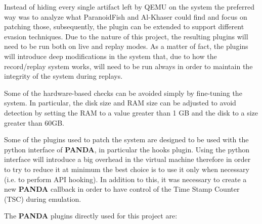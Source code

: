 Instead of hiding every single artifact left by QEMU on the system the preferred way was to analyze what ParanoidFish and Al-Khaser could find and focus on patching those, subsequently, the plugin can be extended to support different evasion techniques. Due to the nature of this project, the resulting plugins will need to be run both on live and replay modes. As a matter of fact, the plugins will introduce deep modifications in the system that, due to how the record/replay system works, will need to be run always in order to maintain the integrity of the system during replays.

Some of the hardware-based checks can be avoided simply by fine-tuning the system. In particular, the disk size and RAM size can be adjusted to avoid detection by setting the RAM to a value greater than 1 GB and the disk to a size greater than 60GB. 

Some of the plugins used to patch the system are designed to be used with the python interface of \textbf{PANDA}, in particular the hooks plugin. Using the python interface will introduce a big overhead in the virtual machine therefore in order to try to reduce it at minimum the best choice is to use it only when necessary (i.e. to perform API hooking). In addition to this, it was necessary to create a new \textbf{PANDA} callback in order to have control of the Time Stamp Counter (TSC) during emulation.  

The \textbf{PANDA} plugins directly used for this project are: 

